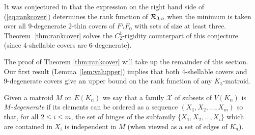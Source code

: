 \documentclass{daj}
\newcommand{\MX}{{\mathcal X}}
\begin{document}

It was conjectured in \cite{JDIMACS} that the 
expression on the right hand side of
(\ref{eq:rankcover}) determines the rank function of 
${\cal R}_{3,n}$ when the minimum is taken over all $9$-degenerate 2-thin covers of $F\setminus F_0$  with sets of size at least three.
Theorem~\ref{thm:rankcover} solves the $C_2^1$-rigidity counterpart of this conjecture (since 4-shellable covers are 6-degenerate). 


The proof of Theorem \ref{thm:rankcover} will take up the remainder of this section.
Our first result (Lemma~\ref{lem:valupper}) implies that both 4-shellable covers and 9-degenerate covers give an upper bound on the rank function of any 
$K_5$-matroid. 

Given a
matroid $M$ on $E(K_n)$ we say that a family $\MX$ of subsets of $V(K_n)$ 
is {\em $M$-degenerate} if  its elements  can be ordered as a sequence $(X_1,X_2,\ldots,X_m)$ so that, for all $2\leq i\leq m$, the set of hinges of the subfamily $\{X_1,X_2,\ldots,X_{i}\}$ which are contained in $X_{i}$ is independent in $M$ (when viewed as a set of edges of $K_n$).
\end{document}

